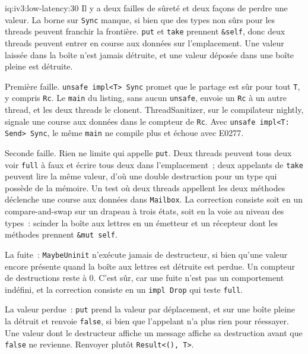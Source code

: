 \begin{solution}{iq:iv3:low-latency:30}
Il y a deux failles de sûreté et deux façons de perdre une valeur. La borne sur \texttt{Sync} manque, si bien que des types non sûrs pour les threads peuvent franchir la frontière. \texttt{put} et \texttt{take} prennent \texttt{\&self}, donc deux threads peuvent entrer en course aux données sur l'emplacement. Une valeur laissée dans la boîte n'est jamais détruite, et une valeur déposée dans une boîte pleine est détruite.

Première faille. \texttt{unsafe impl<T> Sync} promet que le partage est sûr pour tout \texttt{T}, y compris \texttt{Rc}. Le \texttt{main} du listing, sans aucun \texttt{unsafe}, envoie un \texttt{Rc} à un autre thread, et les deux threads le clonent. ThreadSanitizer, sur le compilateur nightly, signale une course aux données dans le compteur de \texttt{Rc}. Avec \texttt{unsafe impl<T: Send> Sync}, le même \texttt{main} ne compile plus et échoue avec E0277.

Seconde faille. Rien ne limite qui appelle \texttt{put}. Deux threads peuvent tous deux voir \texttt{full} à faux et écrire tous deux dans l'emplacement~; deux appelants de \texttt{take} peuvent lire la même valeur, d'où une double destruction pour un type qui possède de la mémoire. Un test où deux threads appellent les deux méthodes déclenche une course aux données dans \texttt{Mailbox}. La correction consiste soit en un compare-and-swap sur un drapeau à trois états, soit en la voie au niveau des types~: scinder la boîte aux lettres en un émetteur et un récepteur dont les méthodes prennent \texttt{\&mut self}.

La fuite~: \texttt{MaybeUninit} n'exécute jamais de destructeur, si bien qu'une valeur encore présente quand la boîte aux lettres est détruite est perdue. Un compteur de destructions reste à 0. C'est sûr, car une fuite n'est pas un comportement indéfini, et la correction consiste en un \texttt{impl Drop} qui teste \texttt{full}.

La valeur perdue~: \texttt{put} prend la valeur par déplacement, et sur une boîte pleine la détruit et renvoie \texttt{false}, si bien que l'appelant n'a plus rien pour réessayer. Une valeur dont le destructeur affiche un message affiche sa destruction avant que \texttt{false} ne revienne. Renvoyer plutôt \texttt{Result<(), T>}.

\end{solution}

